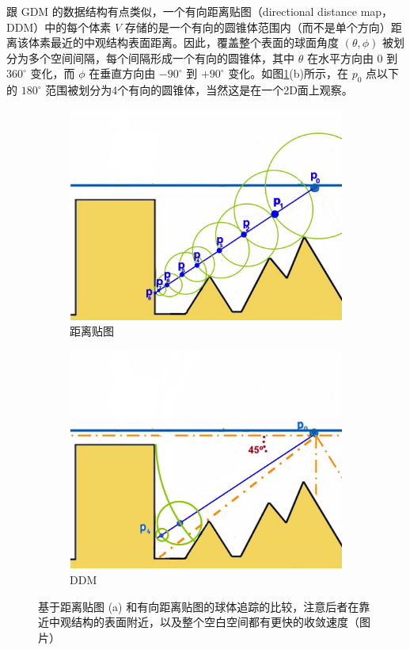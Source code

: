 跟 GDM 的数据结构有点类似，一个有向距离贴图（directional distance map，DDM）中的每个体素 $V$ 存储的是一个有向的圆锥体范围内（而不是单个方向）距离该体素最近的中观结构表面距离。因此，覆盖整个表面的球面角度 $(\theta, \phi)$ 被划分为多个空间间隔，每个间隔形成一个有向的圆锥体，其中 $\theta$ 在水平方向由 0 到 $360^{\circ}$ 变化，而 $\phi$ 在垂直方向由 $−90^{\circ}$ 到 $+90^{\circ}$ 变化。如图\ref{f:df-ddm-comparision}(b)所示，在 $p_0$ 点以下的 $180^{\circ}$ 范围被划分为4个有向的圆锥体，当然这是在一个2D面上观察。

\begin{figure}
	\begin{subfigure}[b]{0.5\textwidth}
		\includegraphics[width=\textwidth]{figures/df/ddm-comparision-1}
		\caption{距离贴图}
	\end{subfigure}
	\begin{subfigure}[b]{0.5\textwidth}
		\includegraphics[width=\textwidth]{figures/df/ddm-comparision-2}
		\caption{DDM}
	\end{subfigure}
	\caption{基于距离贴图 (a) 和有向距离贴图的球体追踪的比较，注意后者在靠近中观结构的表面附近，以及整个空白空间都有更快的收敛速度（图片\cite{a:directional-distance-maps}）}
	\label{f:df-ddm-comparision}
\end{figure}

